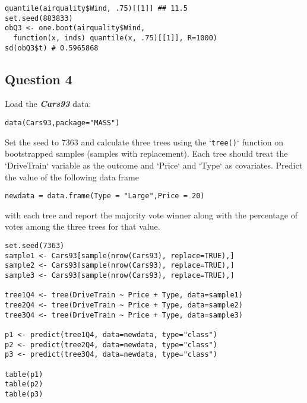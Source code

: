 \documentclass[12pt]{article}
\begin{document}
\begin{framed}
\begin{verbatim}
quantile(airquality$Wind, .75)[[1]] ## 11.5
set.seed(883833)
obQ3 <- one.boot(airquality$Wind, 
  function(x, inds) quantile(x, .75)[[1]], R=1000)
sd(obQ3$t) # 0.5965868
\end{verbatim}
\end{framed}


\newpage
\subsection*{Question 4}

Load the \textit{\textbf{Cars93}} data:

\begin{framed}
\begin{verbatim}
data(Cars93,package="MASS")
\end{verbatim}
\end{framed}

Set the seed to 7363 and calculate three trees using the `\texttt{tree()}` function on
bootstrapped samples (samples with replacement). Each tree should treat the
`DriveTrain` variable as the outcome and `Price` and `Type` as covariates.
Predict the value of the following data frame

\begin{framed}
\begin{verbatim}
newdata = data.frame(Type = "Large",Price = 20)
\end{verbatim}
\end{framed}

with each tree and report the majority vote winner along with the percentage of
votes among the three trees for that value.

\begin{verbatim}
set.seed(7363)
sample1 <- Cars93[sample(nrow(Cars93), replace=TRUE),]
sample2 <- Cars93[sample(nrow(Cars93), replace=TRUE),]
sample3 <- Cars93[sample(nrow(Cars93), replace=TRUE),]

tree1Q4 <- tree(DriveTrain ~ Price + Type, data=sample1)
tree2Q4 <- tree(DriveTrain ~ Price + Type, data=sample2)
tree3Q4 <- tree(DriveTrain ~ Price + Type, data=sample3)

p1 <- predict(tree1Q4, data=newdata, type="class")
p2 <- predict(tree2Q4, data=newdata, type="class")
p3 <- predict(tree3Q4, data=newdata, type="class")

table(p1)
table(p2)
table(p3)

\end{verbatim}
\end{document}

